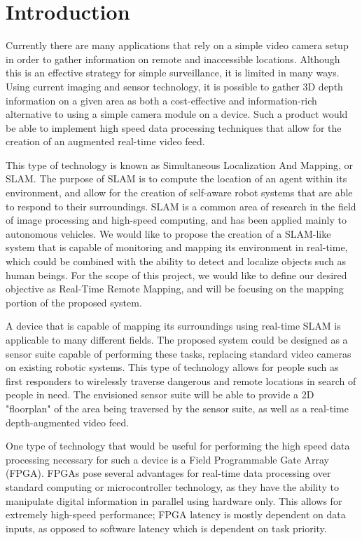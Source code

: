 \section{Introduction}
Currently there are many applications that rely on a simple video camera setup in order to gather information on remote and inaccessible locations. Although this is an effective strategy for simple surveillance, it is limited in many ways. Using current imaging and sensor technology, it is possible to gather 3D depth information on a given area as both a cost-effective and information-rich alternative to using a simple camera module on a device. Such a product would be able to implement high speed data processing techniques that allow for the creation of an augmented real-time video feed.
\par
This type of technology is known as Simultaneous Localization And Mapping, or SLAM. The purpose of SLAM is to compute the location of an agent within its environment, and allow for the creation of self-aware robot systems that are able to respond to their surroundings. SLAM is a common area of research in the field of image processing and high-speed computing, and has been applied mainly to autonomous vehicles. We would like to propose the creation of a SLAM-like system that is capable of monitoring and mapping its environment in real-time, which could be combined with the ability to detect and localize objects such as human beings. For the scope of this project, we would like to define our desired objective as Real-Time Remote Mapping, and will be focusing on the mapping portion of the proposed system.
\par
A device that is capable of mapping its surroundings using real-time SLAM is applicable to many different fields. The proposed system could be designed as a sensor suite capable of performing these tasks, replacing standard video cameras on existing robotic systems. This type of technology allows for people such as first responders to wirelessly traverse dangerous and remote locations in search of people in need. The envisioned sensor suite will be able to provide a 2D "floorplan" of the area being traversed by the sensor suite, as well as a real-time depth-augmented video feed.
\par
One type of technology that would be useful for performing the high speed data processing necessary for such a device is a Field Programmable Gate Array (FPGA). FPGAs pose several advantages for real-time data processing over standard computing or microcontroller technology, as they have the ability to manipulate digital information in parallel using hardware only. This allows for extremely high-speed performance; FPGA latency is mostly dependent on data inputs, as opposed to software latency which is dependent on task priority.
